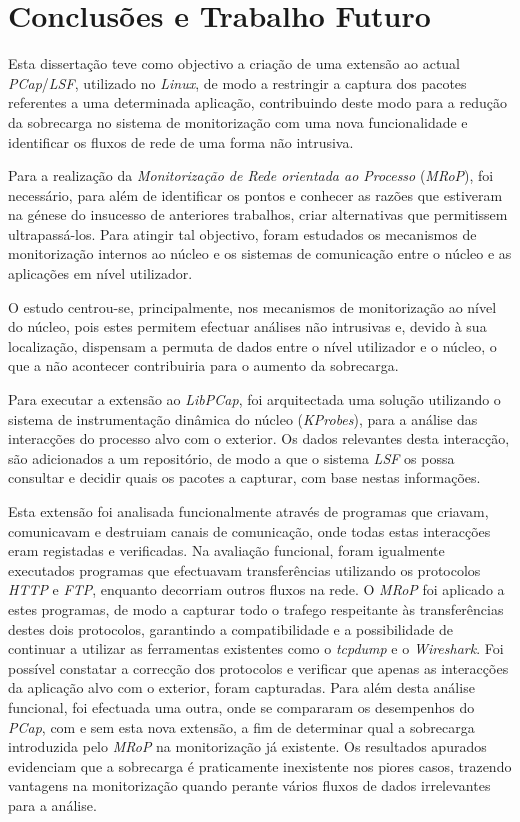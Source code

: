 \chapter{Conclusões e Trabalho Futuro}
\label{cap:conclusao}

Esta dissertação teve como objectivo a criação de uma extensão ao actual \textit{PCap}/\textit{LSF}, utilizado no \textit{Linux}, de modo a restringir a captura dos pacotes referentes a uma determinada aplicação, contribuindo deste modo para a redução da sobrecarga no sistema de monitorização com uma nova funcionalidade e identificar os fluxos de rede de uma forma não intrusiva.

Para a realização da \textit{Monitorização de Rede orientada ao Processo} (\textit{MRoP}), foi necessário, para além de identificar os pontos e conhecer as razões que estiveram na génese do insucesso de anteriores trabalhos, criar alternativas que permitissem ultrapassá-los.
Para atingir tal objectivo, foram estudados os mecanismos de monitorização internos ao núcleo e os sistemas de comunicação entre o núcleo e as aplicações em nível utilizador.

O estudo centrou-se, principalmente, nos mecanismos de monitorização ao nível do núcleo, pois estes permitem efectuar análises não intrusivas e, devido à sua localização, dispensam a permuta de dados entre o nível utilizador e o núcleo, o que a não acontecer contribuiria para o aumento da sobrecarga.

Para executar a extensão ao \textit{LibPCap}, foi arquitectada uma solução utilizando o sistema de instrumentação dinâmica do núcleo (\textit{KProbes}), para a análise das interacções do processo alvo com o exterior.
Os dados relevantes desta interacção, são adicionados a um repositório, de modo a que o sistema \textit{LSF} os possa consultar e decidir quais os pacotes a capturar, com base nestas informações.

Esta extensão foi analisada funcionalmente através de programas que criavam, comunicavam e destruiam canais de comunicação, onde todas estas interacções eram registadas e verificadas.
Na avaliação funcional, foram igualmente executados programas que efectuavam transferências utilizando os protocolos \textit{HTTP} e \textit{FTP}, enquanto decorriam outros fluxos na rede. 
O \textit{MRoP} foi aplicado a estes programas, de modo a capturar todo o trafego respeitante às transferências destes dois protocolos, garantindo a compatibilidade e a possibilidade de continuar a utilizar as ferramentas existentes como o \textit{tcpdump} e o \textit{Wireshark}.
Foi possível constatar a correcção dos protocolos e verificar que apenas as interacções da aplicação alvo com o exterior, foram capturadas.
Para além desta análise funcional, foi efectuada uma outra, onde se compararam os desempenhos do \textit{PCap}, com e sem esta nova extensão, a fim de determinar qual a sobrecarga introduzida pelo \textit{MRoP} na monitorização já existente.
Os resultados apurados evidenciam que a sobrecarga é praticamente inexistente nos piores casos, trazendo vantagens na monitorização quando perante vários fluxos de dados irrelevantes para a análise.

